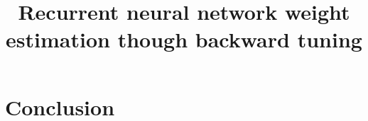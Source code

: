 \documentclass[a4]{article}
\begin{document}
\title{Recurrent neural network weight estimation though backward tuning}

\maketitle
\begin{abstract}\end{abstract}




\section*{Conclusion}
\appendix




{\scriptsize  }
\end{document}

